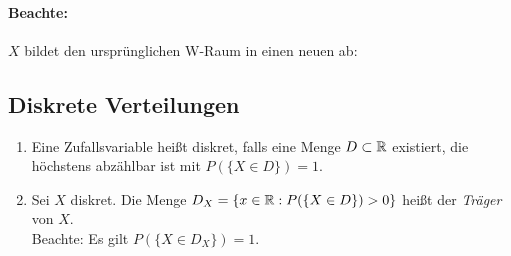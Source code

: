 
\paragraph{Beachte:}
$X$ bildet den ursprünglichen W-Raum in einen neuen ab:
\begin{center}
\end{center}

\subsection{Diskrete Verteilungen}

\begin{definition}
    \begin{enumerate}
        \item Eine Zufallsvariable heißt diskret, falls eine Menge $D \subset \mathbb{R}$
              existiert, die höchstens abzählbar ist mit $P(\{X \in D\})=1$.
        \item Sei $X$ diskret. Die Menge $D_X = \{ x \in \mathbb{R}: P(\{X \in D\})>0 \}$
              heißt der \emph{Träger} von $X$.\\
              Beachte: Es gilt $P(\{X \in D_X \}) = 1$.
    \end{enumerate}
\end{definition}

